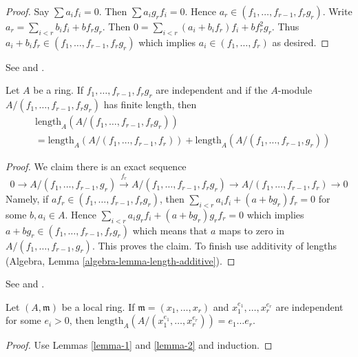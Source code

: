 \begin{proof}
Say $\sum a_if_i = 0$. Then $\sum a_ig_rf_i = 0$.
Hence $a_r \in (f_1, \ldots, f_{r - 1}, f_rg_r)$.
Write $a_r = \sum_{i < r} b_i f_i + b f_rg_r$.
Then $0 = \sum_{i < r} (a_i + b_if_r)f_i + bf_r^2g_r$.
Thus $a_i + b_i f_r \in (f_1, \ldots, f_{r - 1}, f_rg_r)$
which implies $a_i \in (f_1, \ldots, f_r)$ as desired.
\end{proof}

\begin{lemma}
\label{lemma-2}
\begin{reference}
See \cite{Lech-inequalities} and \cite[Lemma 2 page 300]{MatCA}.
\end{reference}
Let $A$ be a ring. If $f_1, \ldots, f_{r - 1}, f_rg_r$
are independent and if the $A$-module
$A/(f_1, \ldots, f_{r - 1}, f_rg_r)$ has finite length, then
\begin{align*}
& \text{length}_A(A/(f_1, \ldots, f_{r - 1}, f_rg_r)) \\
& =
\text{length}_A(A/(f_1, \ldots, f_{r - 1}, f_r)) +
\text{length}_A(A/(f_1, \ldots, f_{r - 1}, g_r))
\end{align*}
\end{lemma}

\begin{proof}
We claim there is an exact sequence
$$
0 \to
A/(f_1, \ldots, f_{r - 1}, g_r) \xrightarrow{f_r}
A/(f_1, \ldots, f_{r - 1}, f_rg_r) \to
A/(f_1, \ldots, f_{r - 1}, f_r) \to 0
$$
Namely, if $a f_r \in (f_1, \ldots, f_{r - 1}, f_rg_r)$, then
$\sum_{i < r} a_i f_i + (a + bg_r)f_r = 0$
for some $b, a_i \in A$. Hence
$\sum_{i < r} a_i g_r f_i + (a + bg_r)g_rf_r = 0$
which implies $a + bg_r \in (f_1, \ldots, f_{r - 1}, f_rg_r)$
which means that $a$ maps to zero in $A/(f_1, \ldots, f_{r - 1}, g_r)$.
This proves the claim.
To finish use additivity of lengths
(Algebra, Lemma \ref{algebra-lemma-length-additive}).
\end{proof}

\begin{lemma}
\label{lemma-3}
\begin{reference}
See \cite{Lech-inequalities} and \cite[Lemma 3 page 300]{MatCA}.
\end{reference}
Let $(A, \mathfrak m)$ be a local ring. If $\mathfrak m = (x_1, \ldots, x_r)$
and $x_1^{e_1}, \ldots, x_r^{e_r}$ are independent for some $e_i > 0$,
then $\text{length}_A(A/(x_1^{e_1}, \ldots, x_r^{e_r})) = e_1\ldots e_r$.
\end{lemma}

\begin{proof}
Use Lemmas \ref{lemma-1} and \ref{lemma-2} and induction.
\end{proof}

